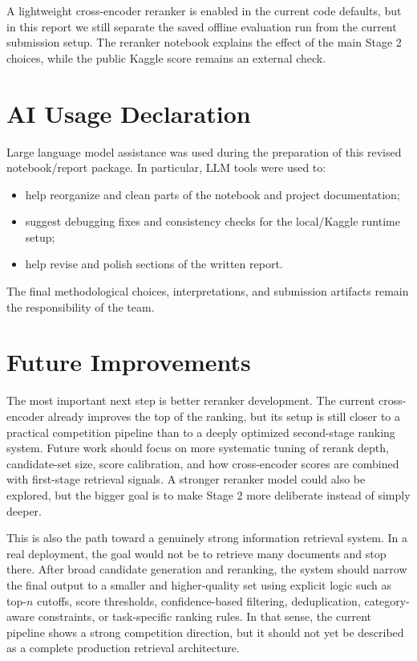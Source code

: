 \documentclass[11pt,a4paper]{article}
\begin{document}
A lightweight cross-encoder reranker is enabled in the current code defaults, but in this report we still separate the saved offline evaluation run from the current submission setup. The reranker notebook explains the effect of the main Stage 2 choices, while the public Kaggle score remains an external check.

\section{AI Usage Declaration}

Large language model assistance was used during the preparation of this revised notebook/report package. In particular, LLM tools were used to:
\begin{itemize}
    \item help reorganize and clean parts of the notebook and project documentation;
    \item suggest debugging fixes and consistency checks for the local/Kaggle runtime setup;
    \item help revise and polish sections of the written report.
\end{itemize}

The final methodological choices, interpretations, and submission artifacts remain the responsibility of the team.

\section{Future Improvements}

The most important next step is better reranker development. The current cross-encoder already improves the top of the ranking, but its setup is still closer to a practical competition pipeline than to a deeply optimized second-stage ranking system. Future work should focus on more systematic tuning of rerank depth, candidate-set size, score calibration, and how cross-encoder scores are combined with first-stage retrieval signals. A stronger reranker model could also be explored, but the bigger goal is to make Stage 2 more deliberate instead of simply deeper.

This is also the path toward a genuinely strong information retrieval system. In a real deployment, the goal would not be to retrieve many documents and stop there. After broad candidate generation and reranking, the system should narrow the final output to a smaller and higher-quality set using explicit logic such as top-\(n\) cutoffs, score thresholds, confidence-based filtering, deduplication, category-aware constraints, or task-specific ranking rules. In that sense, the current pipeline shows a strong competition direction, but it should not yet be described as a complete production retrieval architecture.
\end{document}
